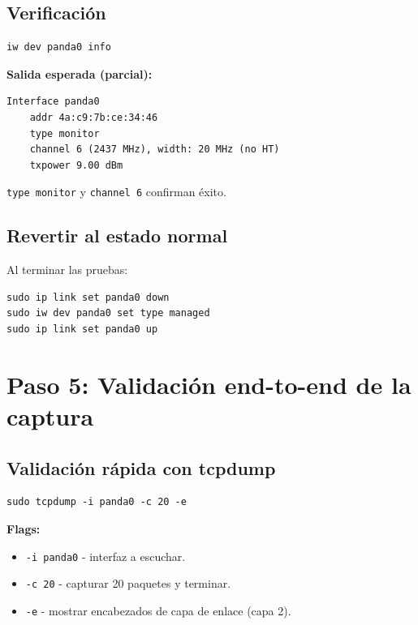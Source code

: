 \documentclass[11pt,a4paper]{article}
\begin{document}
\subsection{Verificación}

\begin{lstlisting}
iw dev panda0 info
\end{lstlisting}

\textbf{Salida esperada (parcial):}

\begin{lstlisting}
Interface panda0
    addr 4a:c9:7b:ce:34:46
    type monitor
    channel 6 (2437 MHz), width: 20 MHz (no HT)
    txpower 9.00 dBm
\end{lstlisting}

\texttt{type monitor} y \texttt{channel 6} confirman éxito.

\subsection{Revertir al estado normal}
Al terminar las pruebas:

\begin{lstlisting}
sudo ip link set panda0 down
sudo iw dev panda0 set type managed
sudo ip link set panda0 up
\end{lstlisting}

\section{Paso 5: Validación end-to-end de la captura}

\subsection{Validación rápida con tcpdump}

\begin{lstlisting}
sudo tcpdump -i panda0 -c 20 -e
\end{lstlisting}

\textbf{Flags:}

\begin{itemize}
  \item \texttt{-i panda0} - interfaz a escuchar.
  \item \texttt{-c 20} - capturar 20 paquetes y terminar.
  \item \texttt{-e} - mostrar encabezados de capa de enlace (capa 2).
\end{itemize}
\end{document}
